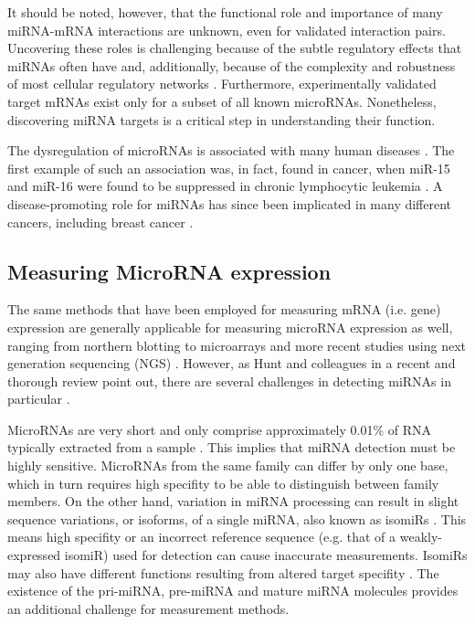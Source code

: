 It should be noted, however, that the functional role and importance of many
miRNA-mRNA interactions are unknown, even for validated interaction pairs.
Uncovering these roles is challenging because of the subtle regulatory effects
that miRNAs often have and, additionally, because of the complexity and
robustness of most cellular regulatory networks \citep{Bartel2009}.
Furthermore, experimentally validated target mRNAs exist only for a subset of
all known microRNAs. Nonetheless, discovering miRNA targets is a critical
step in understanding their function.

The dysregulation of microRNAs is associated with many human diseases
\citep{Jiang2009,VAIHDATÄMÄREFE}. The first example of such an association was, in
fact, found in cancer, when miR-15 and miR-16 were found to be suppressed in
chronic lymphocytic leukemia \citep{Musilova2015}. A disease-promoting role
for miRNAs has since been implicated in many different cancers, including
breast cancer \citep{Melo2011}.



\subsection{Measuring MicroRNA expression}

The same methods that have been employed for measuring mRNA (i.e. gene)
expression are generally applicable for measuring microRNA expression as well,
ranging from northern blotting to microarrays and more recent studies using next
generation sequencing (NGS) \citep{Huang2011}. However, as Hunt and colleagues
in a recent and thorough review point out, there are several challenges in
detecting miRNAs in particular \citep{Hunt2015}.

MicroRNAs are very short and only comprise approximately 0.01\% of RNA
typically extracted from a sample \citep{Dong2013}. This implies that miRNA
detection must be highly sensitive. MicroRNAs from the same family can differ
by only one base, which in turn requires high specifity to be able to
distinguish between family members. On the other hand, variation in miRNA
processing can result in slight sequence variations, or isoforms, of a single
miRNA, also known as isomiRs \citep{StaregaRoslan2011,Lee2010}. This means
high specifity or an incorrect reference sequence (e.g. that of a 
weakly-expressed isomiR) used for detection can cause inaccurate measurements.
IsomiRs may also have different functions resulting from altered target
specifity \citep{Chugh2012}. The existence of the pri-miRNA, pre-miRNA and
mature miRNA molecules provides an additional challenge for measurement
methods.

